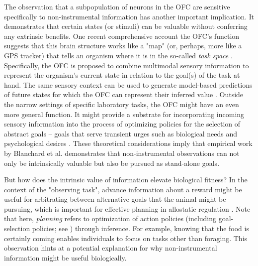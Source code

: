 The observation that a subpopulation of neurons in the \ac{OFC} are sensitive specifically to non-instrumental information \parencite{blanchard_orbitofrontal_2015} has another important implication. It demonstrates that certain states (or stimuli) can be valuable without conferring any extrinsic benefits. One recent comprehensive account the \ac{OFC}'s function suggests that this brain structure works like a "map" (or, perhaps, more like a GPS tracker) that tells an organism where it is in the so-called \emph{task space} \parencite{wilson_orbitofrontal_2014}. Specifically, the \ac{OFC} is proposed to combine multimodal sensory information to represent the organism's current state in relation to the goal(s) of the task at hand. The same sensory context can be used to generate model-based predictions of future states for which the \ac{OFC} can represent their inferred value \parencite[see][for details]{stalnaker_what_2015}. Outside the narrow settings of specific laboratory tasks, the OFC might have an even more general function. It might provide a substrate for incorporating incoming sensory information into the process of optimizing policies for the selection of abstract goals \parencite{fine2021prefrontal} -- goals that serve transient urges such as biological needs and psychological desires \parencite{juechems_where_2019}. These theoretical considerations imply that empirical work by Blanchard et al. \parencite{blanchard_orbitofrontal_2015} demonstrates that non-instrumental observations can not only be intrinsically valuable but also be pursued as stand-alone goals.

But how does the intrinsic value of information elevate biological fitness? In the context of the "observing task", advance information about a reward might be useful for arbitrating between alternative goals that the animal might be pursuing, which is important for effective planning in allostatic regulation \parencite{fine2021prefrontal,sterling_allostasis_2012}. Note that here, \emph{planning} refers to optimization of action policies (including goal-selection policies; see \parencite{fine2021prefrontal}) through inference. For example, knowing that the food is certainly coming enables individuals to focus on tasks other than foraging. This observation hints at a potential explanation for why non-instrumental information might be useful biologically.

